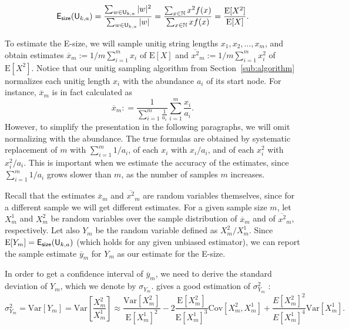 \documentclass[a4paper,11pt]{article}
\newcommand{\kristoffer}[1]{{\color{red}{#1}}}
\newcommand{\U}{\mathsf{U}_{k,a}}
\newcommand{\esize}{{\sf E_{size}}}
\newcommand{\Var}{\text{Var}}
\newcommand{\Cov}{\text{Cov}}
\newcommand{\E}{\text{E}}
\begin{document}
\[\esize(\U) = \frac{\sum_{w \in \U}|w|^2}{\sum_{w \in \U}|w|} = \frac{\sum_{x \in \mathbb{N}} x^2 f(x)}{\sum_{x \in \mathbb{N}} xf(x)} =  \frac{\E[X^2]}{\E[X]}.\]

To estimate the E-size, we will sample unitig string lengths $x_1,x_2,\dots,x_m$, and obtain estimates $\overline{x}_m := 1/m\sum_{i=1}^{m} x_i$ of $\E[X]$ and $\overline{x^2}_m := 1/m\sum_{i=1}^{m} x_i^2$ of $\E[X^2]$. Notice that our unitig sampling algorithm from Section~\ref{sub:algorithm} normalizes each unitig length $x_i$ with the abundance $a_i$ of its start node. For instance, $\overline{x}_m$ is in fact calculated as 
\[\overline{x}_m: = \frac{1}{\sum_{i = 1}^m \frac{1}{a_i}}{\sum_{i=1}^{m} \frac{x_i}{a_i}}.\]
However, to simplify the presentation in the following paragraphs, we will omit normalizing with the abundance. The true formulas are obtained by systematic replacement of $m$ with $\sum_{i = 1}^m 1/a_i$, of each $x_i$ with $x_i/a_i$, and of each $x_i^2$ with $x_i^2/a_i$. This is important when we estimate the accuracy of the estimates, since $\sum_{i = 1}^m 1/a_i$ grows slower than $m$, as the number of samples $m$ increases.

Recall that the estimates $\overline{x}_m$ and $\overline{x^2}_m$ are random variables themselves, since for a different sample we will get different estimates. For a given sample size $m$, let $X^1_{m}$ and $X^2_{m}$ be random variables over the sample distribution of $\overline{x}_m$ and of $\overline{x^2}_m$, respectively. Let also $Y_m$ be the random variable defined as $X^2_m/X^1_m$. Since $\E[Y_m] = \esize(\U)$ (which holds for any given unbiased estimator), we can report the sample estimate $\overline{y}_m$ for $Y_m$ as our estimate for the E-size. 

In order to get a confidence interval of $\overline{y}_m$, we need to derive the standard deviation of $Y_m$, which we denote by $\sigma_{Y_m}$. \kristoffer{If ... is ..., then the first order Taylor expansion} gives a good estimation of $\sigma_{Y_m}^2$ \cite{Benaroya:2005aa}:
\[\sigma_{Y_m}^2 = \Var\left[Y_m\right] = \Var\left[\frac{X^2_m}{X^1_m}\right] \approx \frac{\Var\left[X^2_m\right]}{\E\left[X^1_m\right]^2} -2\frac{\E\left[X^2_m\right]}{\E\left[X^1_m\right]^3}\Cov\left[X^2_m,X^1_m\right] + \frac{E\left[X^2_m\right]^2}{E\left[X^1_m\right]^4}\Var\left[X^1_m\right].\] 
\end{document}
